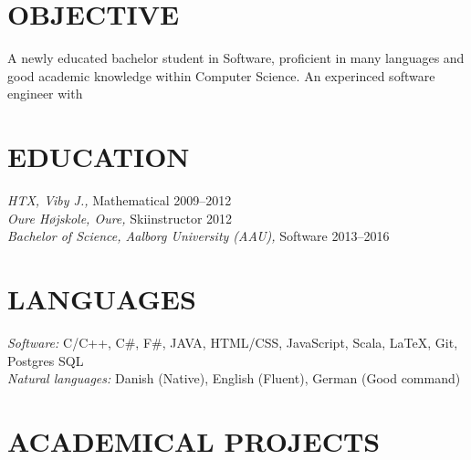 \documentclass[margin, 10pt]{res} %
\begin{document}
\begin{resume}

 
\section{OBJECTIVE}  

A newly educated bachelor student in Software, proficient in many languages and good academic knowledge within Computer Science.
An experinced software engineer with 


\section{EDUCATION}

{\sl HTX, Viby J.,} Mathematical \hfill 2009--2012 \\
{\sl Oure Højskole, Oure,} Skiinstructor \hfill 2012 \\
{\sl Bachelor of Science, Aalborg University (AAU),} Software \hfill 2013--2016
 
\section{LANGUAGES} 

{\sl Software:} 
C/C++, C\#, F\#, JAVA, HTML/CSS, JavaScript, Scala, LaTeX, Git, Postgres SQL \\
{\sl Natural languages:}
{Danish (Native), English (Fluent), German (Good command)}
 
\section{ACADEMICAL PROJECTS}


\end{resume}
\end{document}
